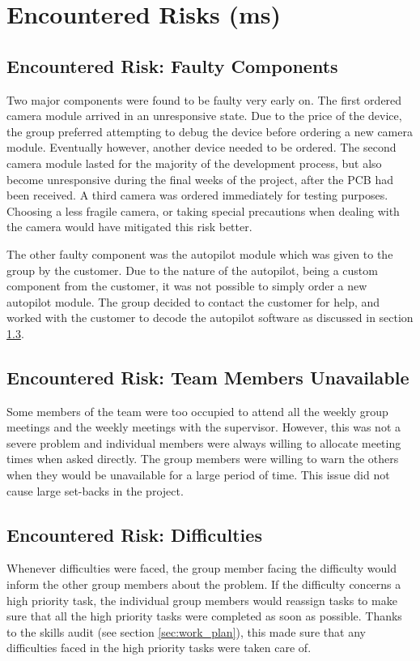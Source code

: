 \section{Encountered Risks (ms)}
\label{encountered risks}

\subsection{Encountered Risk: Faulty Components}
Two major components were found to be faulty very early on. 
The first ordered camera module  
arrived in an unresponsive state. 
Due to the price of the device, 
the group preferred attempting to debug the device before 
ordering a new camera module. 
Eventually however, another device needed to be ordered. 
The second camera module lasted for the majority of 
the development process, but also 
become unresponsive during the final weeks of the project,
after the PCB had been received. 
A third camera was ordered immediately for testing purposes.
Choosing a less fragile camera, or taking special precautions
when dealing with the camera would have mitigated this risk better.

The other faulty component was the autopilot module which 
was given to the group by the customer. 
Due to the nature of the autopilot, being a custom component 
from the customer, it was not possible to simply 
order a new autopilot module. 
The group decided to contact the customer for help, and 
worked with the customer to decode the autopilot software 
as discussed in section \ref{}.

\subsection{Encountered Risk: Team Members Unavailable}
Some members of the team were too occupied to attend 
all the weekly group meetings and 
the weekly meetings with the supervisor. 
However, this was not a severe problem and individual 
members were always willing to allocate 
meeting times when asked directly. 
The group members were willing to warn the others 
when they would be unavailable for a large period of time. 
This issue did not cause large set-backs in the project.

\subsection{Encountered Risk: Difficulties}
Whenever difficulties were faced, the group member 
facing the difficulty would inform the other 
group members about the problem. 
If the difficulty concerns a high priority task, 
the individual group members would reassign 
tasks to make sure that all the high priority 
tasks were completed as soon as possible. 
Thanks to the skills audit (see section \ref{sec:work_plan}), this made sure that 
any difficulties faced in the high priority 
tasks were taken care of. 

